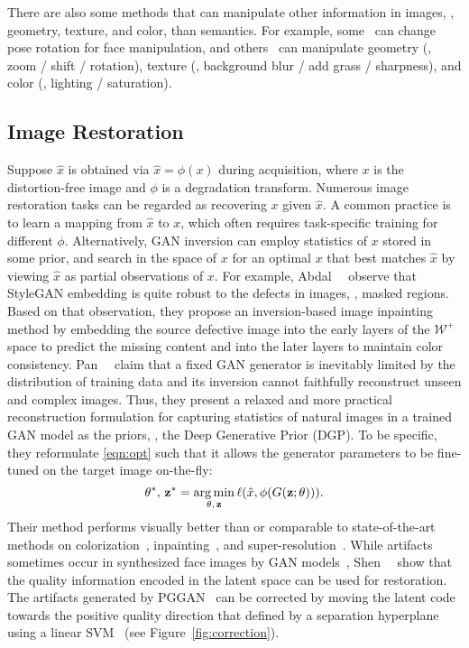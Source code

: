 There are also some methods that can manipulate other information in images, \eg, geometry, texture, and color, than semantics. 
For example, some~\cite{abdal2020styleflow,abdal2019image2stylegan} can change pose rotation for face manipulation, and others~\cite{voynov2020latent} can manipulate geometry (\eg, zoom / shift / rotation), texture (\eg, background blur / add grass / sharpness), and color (\eg, lighting / saturation).

\figapp

\figcorrect

\subsection{Image Restoration}
\label{sec:restoration}

Suppose $\hat{x}$ is obtained via $\hat{x}=\phi(x)$ during acquisition, where $x$ is the distortion-free image and $\phi$ is a degradation transform.
Numerous image restoration tasks can be regarded as recovering $x$ given $\hat{x}$. 
A common practice is to learn a mapping from $\hat{x}$ to $x$, which often requires task-specific training for different $\phi$.
Alternatively, GAN inversion can employ statistics of $x$ stored in some prior, and search in the space of $x$ for an optimal $x$ that best matches $\hat{x}$ by viewing $\hat{x}$ as partial observations of $x$.
For example, Abdal~\etal~\cite{abdal2019image2stylegan,abdal2020image2stylegan2} observe that StyleGAN embedding is quite robust to the defects in images, \eg, masked regions.
Based on that observation, they propose an inversion-based image inpainting method by embedding the source defective image into the early layers of the $\mathcal{W}^+$ space to predict the missing content and into the later layers to maintain color consistency.
Pan~\etal~\cite{pan2020exploiting} claim that a fixed GAN generator is inevitably limited by the distribution of training data and its inversion cannot faithfully reconstruct unseen and complex images.
Thus, they present a relaxed and more practical reconstruction formulation for capturing statistics of natural images in a trained GAN model as the priors, \ie, the Deep Generative Prior (DGP).
To be specific, they reformulate \eqref{eqn:opt} such that it allows the generator parameters to be fine-tuned on the target image on-the-fly:
\begin{equation}
\theta^*,\, \z^* = \underset{\theta,\, \z}{\arg\min}\, \ell(\hat{x}, \phi(G(\z; \theta))).
\label{eqn:opt_dgp}
\end{equation}
Their method performs visually better than or comparable to state-of-the-art methods on colorization~\cite{larsson2016learning}, inpainting~\cite{ulyanov2018deep}, and super-resolution~\cite{shaham2019singan}.
While artifacts sometimes occur in synthesized face images by GAN models~\cite{karras2017progressive,karras2019style}, 
Shen~\etal~\cite{shen2020interpreting} show that the quality information encoded in the latent space can be used for restoration. 
The artifacts generated by PGGAN~\cite{karras2017progressive} can be corrected by moving the latent code towards the positive quality direction that defined by a separation hyperplane using a linear SVM~\cite{cortes1995support} (see Figure~\ref{fig:correction}). 
 
